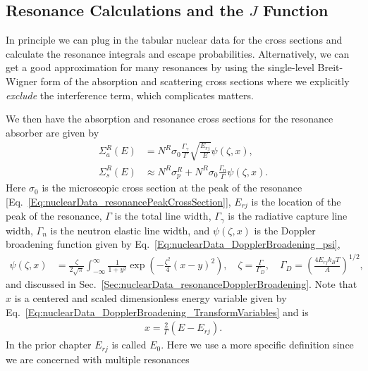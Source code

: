 \subsection{Resonance Calculations and the $J$ Function} \label{Sec:thermalization_resonanceCalculationsJFunction}

In principle we can plug in the tabular nuclear data for the cross sections and calculate the resonance integrals and escape probabilities. Alternatively, we can get a good approximation for many resonances by using the single-level Breit-Wigner form of the absorption and scattering cross sections where we explicitly \emph{exclude} the interference term, which complicates matters. 

We then have the absorption and resonance cross sections for the resonance absorber are given by
\begin{subequations}
\begin{align}
  \Sigma_a^R(E) &= N^R \sigma_0 \frac{\Gamma_\gamma}{\Gamma} \sqrt{ \frac{E_{rj}}{E} } \psi(\zeta,x), \\
  \Sigma_s^R(E) &\approx N^R \sigma_p^R +  N^R \sigma_0 \frac{\Gamma_n}{\Gamma} \psi(\zeta,x) .
\end{align}
\end{subequations}
Here $\sigma_0$ is the microscopic cross section at the peak of the resonance [Eq.~\eqref{Eq:nuclearData_resonancePeakCrossSection}], $E_{rj}$ is the location of the peak of the resonance, $\Gamma$ is the total line width, $\Gamma_\gamma$ is the radiative capture line width, $\Gamma_n$ is the neutron elastic line width, and $\psi(\zeta,x)$ is the Doppler broadening function given by Eq.~\eqref{Eq:nuclearData_DopplerBroadening_psi},
\begin{align}
  \psi(\zeta,x) &= \frac{\zeta}{2\sqrt{\pi}} \int_{-\infty}^\infty \frac{1}{1+y^2} \exp\left( -\frac{\zeta^2}{4} ( x - y )^2 \right) , \quad \zeta = \frac{\Gamma}{\Gamma_D}, \quad \Gamma_D = \left( \frac{4 E_{rj} k_B T }{ A } \right)^{1/2} , \nonumber
\end{align}
and discussed in Sec.~\ref{Sec:nuclearData_resonanceDopplerBroadening}. Note that $x$ is a centered and scaled dimensionless energy variable given by Eq.~\eqref{Eq:nuclearData_DopplerBroadening_TransformVariables} and is
\begin{align}
  x = \frac{2}{\Gamma} ( E - E_{rj} ) . \nonumber
\end{align}
In the prior chapter $E_{rj}$ is called $E_0$. Here we use a more specific definition since we are concerned with multiple resonances

